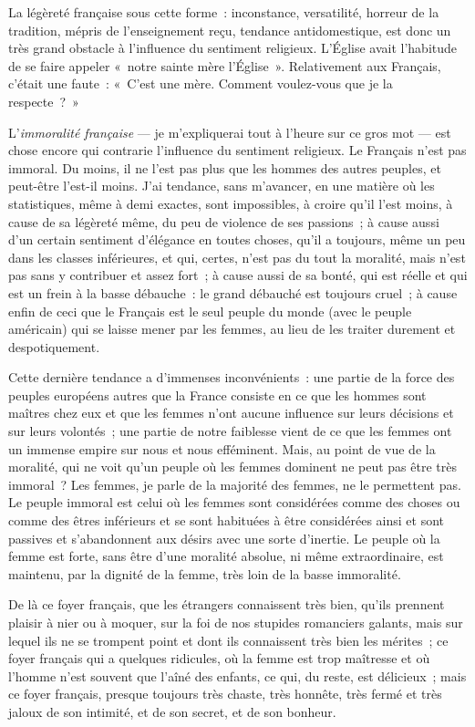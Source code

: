 \documentclass[french,twoside]{book} %
\newcommand{\astertri}{\medskip\par\centerline{\color{rubric}\large\selectfont{\syms ✻\,✻\,✻}}\medskip\par}%
\begin{document}
La légèreté française sous cette forme : inconstance, versatilité, horreur de la tradition, mépris de l’enseignement reçu, tendance antidomestique, est donc un très grand obstacle à l’influence du sentiment religieux. L’Église avait l’habitude de se faire appeler « notre sainte mère l’Église ». Relativement aux Français, c’était une faute : « C’est une mère. Comment voulez-vous que je la respecte ? »\par

\astertri

\noindent L’{\itshape immoralité française} — je m’expliquerai tout à l’heure sur ce gros mot — est chose encore qui contrarie l’influence du sentiment religieux. Le Français n’est pas immoral. Du moins, il ne l’est pas plus que les hommes des autres peuples, et peut-être l’est-il moins. J’ai tendance, sans m’avancer, en une matière où les statistiques, même à demi exactes, sont impossibles, à croire qu’il l’est  moins, à cause de sa légèreté même, du peu de violence de ses passions ; à cause aussi d’un certain sentiment d’élégance en toutes choses, qu’il a toujours, même un peu dans les classes inférieures, et qui, certes, n’est pas du tout la moralité, mais n’est pas sans y contribuer et assez fort ; à cause aussi de sa bonté, qui est réelle et qui est un frein à la basse débauche : le grand débauché est toujours cruel ; à cause enfin de ceci que le Français est le seul peuple du monde (avec le peuple américain) qui se laisse mener par les femmes, au lieu de les traiter durement et despotiquement.\par
Cette dernière tendance a d’immenses inconvénients : une partie de la force des peuples européens autres que la France consiste en ce que les hommes sont maîtres chez eux et que les femmes n’ont aucune influence sur leurs décisions et sur leurs volontés ; une partie de notre faiblesse vient de ce que les femmes ont un immense empire sur nous et nous efféminent. Mais, au point de vue de la moralité, qui ne voit qu’un peuple où les femmes dominent ne peut pas être très immoral ? Les femmes, je parle de la majorité des femmes, ne le permettent pas. Le peuple immoral est celui où les femmes sont considérées comme des choses ou comme des êtres inférieurs et se sont habituées à être considérées ainsi et sont passives et s’abandonnent  aux désirs avec une sorte d’inertie. Le peuple où la femme est forte, sans être d’une moralité absolue, ni même extraordinaire, est maintenu, par la dignité de la femme, très loin de la basse immoralité.\par
De là ce foyer français, que les étrangers connaissent très bien, qu’ils prennent plaisir à nier ou à moquer, sur la foi de nos stupides romanciers galants, mais sur lequel ils ne se trompent point et dont ils connaissent très bien les mérites ; ce foyer français qui a quelques ridicules, où la femme est trop maîtresse et où l’homme n’est souvent que l’aîné des enfants, ce qui, du reste, est délicieux ; mais ce foyer français, presque toujours très chaste, très honnête, très fermé et très jaloux de son intimité, et de son secret, et de son bonheur.\par
\end{document}
